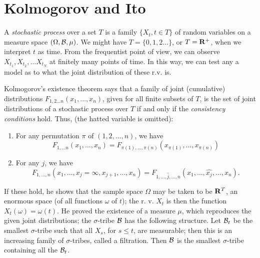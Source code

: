 \section{Kolmogorov and Ito}
A {\em stochastic process} over a set $T$ is a family $\{X_t,t\in T\}$
of random variables on a measure space $(\Omega,{\cal B},\mu)$.
We might have $T=\{0,1,2\ldots\}$, or $T={\bf R}^+$, when we interpret
$t$ as time. From the frequentist point of view, we can observe
$X_{t_1},X_{t_2},\ldots X_{t_N}$ at finitely many points of time.
In this way, we can test any a model as to what the joint distribution
of these r.v. is.

Kolmogorov's existence theorem says that a family of joint (cumulative)
distributions
$F_{1,2\ldots n}(x_1,\ldots,x_n)$, given for all finite subsets of $T$, is
the set of joint distributions of a stochastic process over $T$ if and only
if the {\em consistency conditions} hold. Thus, (the hatted variable is omitted):
\begin{enumerate}
\item For any permutation $\pi$ of $(1,2,\ldots,n)$, we have
\[F_{1,\ldots n}(x_1,\ldots,x_n)=F_{\pi(1),\ldots,\pi(n)}(x_{\pi(1)},
\ldots,x_{\pi(n)})\]
\item For any $j$, we have
\[ F_{1,\ldots,n}(x_1,\ldots,x_j=\infty,x_{j+1},\ldots,x_n)=F_{1,\ldots,
\hat{j},\ldots,n}(x_1,\ldots,\hat{x_j},\ldots,x_n).\]
\end{enumerate}

If these hold, he shows that the sample space $\Omega$ may be taken to
be ${\bf R}^T$, an enormous space (of all functions $\omega$ of $t$); the
r. v. $X_t$ is then the function $X_t(\omega)=\omega(t)$.
He proved the existence of
a measure $\mu$, which reproduces the given joint distributions; the
$\sigma$-tribe ${\cal B}$ has the following structure. 
Let ${\cal B}_t$ be the smallest $\sigma$-tribe such that all $X_s$, for
$s\leq t$, are measurable; then this is an increasing family of
$\sigma$-tribes, called a filtration. Then ${\cal B}$ is the smallest
$\sigma$-tribe containing all the ${\cal B}_t$.

